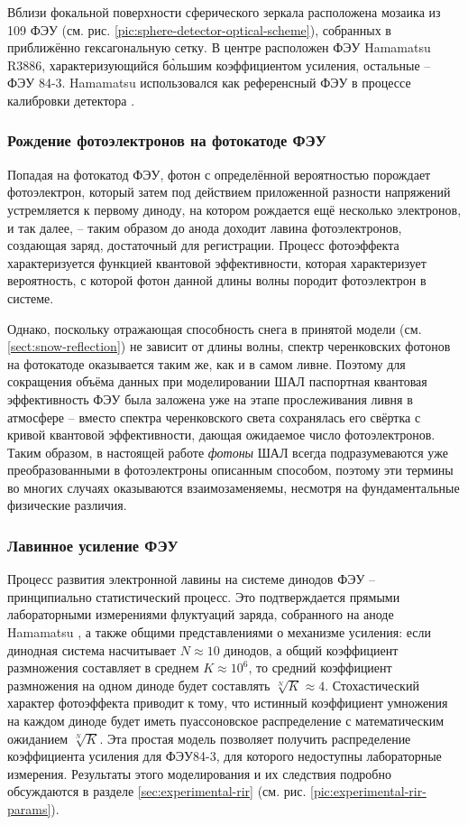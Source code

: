 \documentclass[12pt]{book}
\begin{document}
	Вблизи фокальной поверхности сферического зеркала расположена мозаика из 109 ФЭУ (см. рис. \ref{pic:sphere-detector-optical-scheme}), собранных в приближённо гексагональную сетку. В центре расположен ФЭУ Hamamatsu R3886, характеризующийся б\`{о}льшим коэффициентом усиления, остальные -- ФЭУ 84-3. Hamamatsu использовался как референсный ФЭУ в процессе калибровки детектора \cite{SphereCalibration2016}.

	\subsubsection{Рождение фотоэлектронов на фотокатоде ФЭУ}

	Попадая на фотокатод ФЭУ, фотон с определённой вероятностью порождает фотоэлектрон, который затем под действием приложенной разности напряжений устремляется к первому диноду, на котором рождается ещё несколько электронов, и так далее, -- таким образом до анода доходит лавина фотоэлектронов, создающая заряд, достаточный для регистрации. Процесс фотоэффекта характеризуется функцией квантовой эффективности, которая характеризует вероятность, с которой фотон данной длины волны породит фотоэлектрон в системе.
	
	Однако, поскольку отражающая способность снега в принятой модели (см. \ref{sect:snow-reflection}) не зависит от длины волны, спектр черенковских фотонов на фотокатоде оказывается таким же, как и в самом ливне. Поэтому для сокращения объёма данных при моделировании ШАЛ паспортная квантовая эффективность ФЭУ была заложена уже на этапе прослеживания ливня в атмосфере -- вместо спектра черенковского света сохранялась его свёртка с кривой квантовой эффективности, дающая ожидаемое число фотоэлектронов. Таким образом, в настоящей работе \textit{фотоны} ШАЛ всегда подразумеваются уже преобразованными в фотоэлектроны описанным способом, поэтому эти термины во многих случаях оказываются взаимозаменяемы, несмотря на фундаментальные физические различия.
	
	\subsubsection{Лавинное усиление ФЭУ}
	\label{sec:pmt-amplification-description}
	
	Процесс развития электронной лавины на системе динодов ФЭУ -- принципиально статистический процесс. Это подтверждается прямыми лабораторными измерениями флуктуаций заряда, собранного на аноде Hamamatsu \cite[рис. 9]{SphereCalibration2016}, а также общими представлениями о механизме усиления: если динодная система насчитывает $N \approx 10$ динодов, а общий коэффициент размножения составляет в среднем $K \approx 10^6$, то средний коэффициент размножения на одном диноде будет составлять $\sqrt[N]{K} \approx 4$. Стохастический характер фотоэффекта приводит к тому, что истинный коэффициент умножения на каждом диноде будет иметь пуассоновское распределение с математическим ожиданием $\sqrt[N]{K}$. Эта простая модель позволяет получить распределение коэффициента усиления для ФЭУ84-3, для которого недоступны лабораторные измерения. Результаты этого моделирования и их следствия подробно обсуждаются в разделе \ref{sec:experimental-rir} (см. рис. \ref{pic:experimental-rir-params}).
\end{document}
